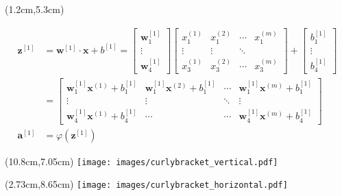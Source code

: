 \documentclass{beamer}
\begin{document}
{\begin{textblock*}{11.2cm}(1.2cm,5.3cm) %
\begin{footnotesize}
\begin{align*}
\mathbf{z}^{[1]} &=\mathbf{w}^{[1]}\cdot\mathbf{x}+b^{[1]} = \left[
   \begin{array}{c}
     \mathbf{w}_1^{[1]} \\[-1ex]
    \!\!\vdots\\[-1ex]
     \mathbf{w}_4^{[1]} 
   \end{array}
\right]
\left[
   \begin{array}{cccc}
     x_1^{(1)} & x_1^{(2)} & \cdots & x_1^{(m)} \\[-1ex]
     \!\!\!\vdots & \!\!\!\vdots & \ddots & \\[-1ex]    
     x_3^{(1)} & x_3^{(2)} & \cdots & x_3^{(m)} 
   \end{array}
\right]
+
\left[
   \begin{array}{c}
     b_1^{[1]}\\[-1ex]
     \!\!\vdots\\[-1ex]
     b_4^{[1]} 
   \end{array}
\right]\\
&=
\left[
   \begin{array}{cccc}
     \mathbf{w}_1^{[1]}\mathbf{x}^{(1)}+b_1^{[1]} & \mathbf{w}_1^{[1]}\mathbf{x}^{(2)}+b_1^{[1]} & \cdots & \mathbf{w}_1^{[1]}\mathbf{x}^{(m)}+b_1^{[1]} \\
    \vdots & \vdots & \ddots & \vdots \\
     \mathbf{w}_4^{[1]}\mathbf{x}^{(1)}+b_4^{[1]} & \cdots & \cdots &\mathbf{w}_4^{[1]}\mathbf{x}^{(m)}+b_4^{[1]}
   \end{array}
\right]\\[3ex]
\mathbf{a}^{[1]}&=\varphi(\mathbf{z}^{[1]})
\end{align*}
\end{footnotesize}
\end{textblock*}



\begin{textblock*}{0.14cm}(10.8cm,7.05cm) %
\texttt{[image: images/curlybracket\_vertical.pdf]}
\end{textblock*}


\begin{textblock*}{7.7cm}(2.73cm,8.65cm) %
\texttt{[image: images/curlybracket\_horizontal.pdf]}
\end{textblock*}


}
\end{document}
